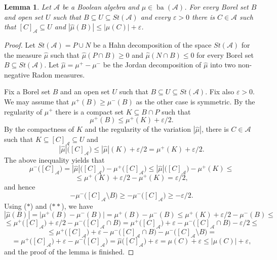 \documentclass[a4paper,11pt,fleqn]{amsart}
\newtheorem{lemma}[theorem]{Lemma}
\theoremstyle{definition}
\theoremstyle{remark}
\numberwithin{equation}{section}
\newcommand{\eps}{\varepsilon}
\newcommand{\aA}{\mathcal{A}}
\DeclareMathOperator{\ba}{ba}
\newcommand{\sm}{\setminus}
\newcommand{\sub}{\subseteq}
\newcommand{\wh}{\widehat}
\newcommand{\clopen}[1]{\left[#1\right]}
\begin{document}
\begin{lemma}\label{lemma:regularity}
    Let $\aA$ be a Boolean algebra and $\mu\in\ba(\aA)$. For every Borel set $B$ and open set $U$ such that $B\sub U\sub St(\aA)$ and every $\eps>0$ there is $C\in\aA$ such that $\clopen{C}_\aA\sub U$ and $|\wh{\mu}(B)|\le|\mu(C)|+\eps$.
\end{lemma}
\begin{proof}
    Let $St(\aA)=P\cup N$ be a Hahn decomposition of the space $St(\aA)$ for the measure $\wh{\mu}$ such that $\wh{\mu}(P\cap B)\ge0$ and $\wh{\mu}(N\cap B)\le0$ for every Borel set $B\sub St(\aA)$. Let $\wh{\mu}=\mu^+-\mu^-$ be the Jordan decomposition of $\wh{\mu}$ into two non-negative Radon measures.

    Fix a Borel set $B$ and an open set $U$ such that $B\sub U\sub St(\aA)$. Fix also $\eps>0$. We may assume that $\mu^+(B)\ge\mu^-(B)$ as the other case is symmetric. By the regularity of $\mu^+$ there is a compact set $K\sub B\cap P$ such that
    \[\tag{$*$}\mu^+(B)\le\mu^+(K)+\eps/2.\]
    By the compactness of $K$ and the regularity of the variation $|\wh{\mu}|$, there is $C\in\aA$ such that $K\sub\clopen{C}_\aA\sub U$ and
    \[|\wh{\mu}|\big(\clopen{C}_\aA\big)\le|\wh{\mu}|(K)+\eps/2=\mu^+(K)+\eps/2.\]
    The above inequality yields that
    \[\mu^-\big(\clopen{C}_\aA\big)=|\wh{\mu}|\big(\clopen{C}_\aA\big)-\mu^+\big(\clopen{C}_\aA\big)\le|\wh{\mu}|\big(\clopen{C}_\aA\big)-\mu^+(K)\le\]
    \[\le\mu^+(K)+\eps/2-\mu^+(K)=\eps/2,\]
    and hence
    \[\tag{$**$}-\mu^-\big(\clopen{C}_\aA\sm B\big)\ge-\mu^-\big(\clopen{C}_\aA\big)\ge-\eps/2.\]
    Using ($*$) and ($**$), we have
    \[|\wh{\mu}(B)|=\big|\mu^+(B)-\mu^-(B)\big|=\mu^+(B)-\mu^-(B)\le\mu^+(K)+\eps/2-\mu^-(B)\le\]
    \[\le\mu^+\big(\clopen{C}_\aA\big)+\eps/2-\mu^-\big(\clopen{C}_\aA\cap B\big)=\mu^+\big(\clopen{C}_\aA\big)+\eps-\mu^-\big(\clopen{C}_\aA\cap B\big)-\eps/2\le\]
    \[\le\mu^+\big(\clopen{C}_\aA\big)+\eps-\mu^-\big(\clopen{C}_\aA\cap B\big)-\mu^-\big(\clopen{C}_\aA\sm B\big)=\]
    \[=\mu^+\big(\clopen{C}_\aA\big)+\eps-\mu^-\big(\clopen{C}_\aA\big)=\wh{\mu}\big(\clopen{C}_\aA\big)+\eps=\mu(C)+\eps\le|\mu(C)|+\eps,\]
    and the proof of the lemma is finished.
\end{proof}
\end{document}
